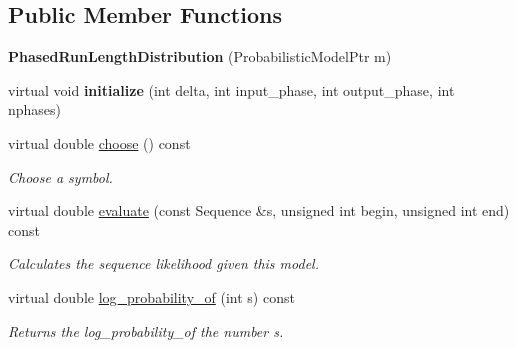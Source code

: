 \subsection*{Public Member Functions}
\begin{DoxyCompactItemize}
\item 
\mbox{\label{classtops_1_1PhasedRunLengthDistribution_ad97ae799eb5ff9d311fc47f35043050f}} 
{\bfseries Phased\+Run\+Length\+Distribution} (Probabilistic\+Model\+Ptr m)
\item 
\mbox{\label{classtops_1_1PhasedRunLengthDistribution_a05a323ceabf01e8dc0ffeb1704e72d2f}} 
virtual void {\bfseries initialize} (int delta, int input\+\_\+phase, int output\+\_\+phase, int nphases)
\item 
\mbox{\label{classtops_1_1PhasedRunLengthDistribution_aa353d25adeed132607dc95cc12bce15f}} 
virtual double \hyperlink{classtops_1_1PhasedRunLengthDistribution_aa353d25adeed132607dc95cc12bce15f}{choose} () const
\begin{DoxyCompactList}\small\item\em Choose a symbol. \end{DoxyCompactList}\item 
\mbox{\label{classtops_1_1PhasedRunLengthDistribution_a550b1133da43d3e78ae13b103d0d6420}} 
virtual double \hyperlink{classtops_1_1PhasedRunLengthDistribution_a550b1133da43d3e78ae13b103d0d6420}{evaluate} (const Sequence \&s, unsigned int begin, unsigned int end) const
\begin{DoxyCompactList}\small\item\em Calculates the sequence likelihood given this model. \end{DoxyCompactList}\item 
\mbox{\label{classtops_1_1PhasedRunLengthDistribution_af0017534ef0aeaa16587399b529463c3}} 
virtual double \hyperlink{classtops_1_1PhasedRunLengthDistribution_af0017534ef0aeaa16587399b529463c3}{log\+\_\+probability\+\_\+of} (int s) const
\begin{DoxyCompactList}\small\item\em Returns the log\+\_\+probability\+\_\+of the number s. \end{DoxyCompactList}\item 

\end{DoxyCompactItemize}
